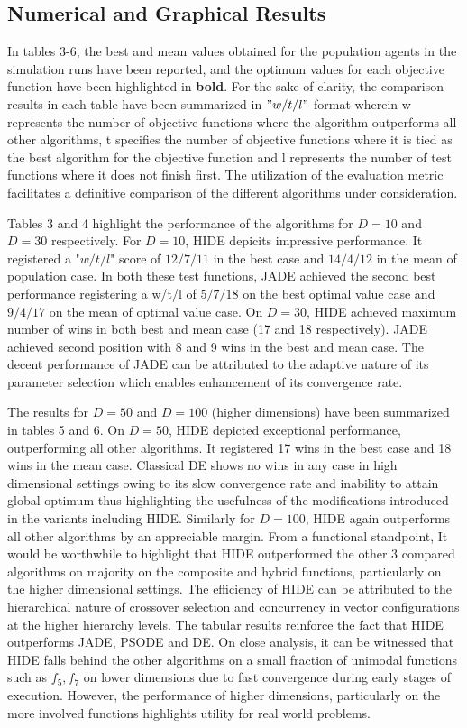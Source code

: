\documentclass[a4paper,twoside]{article}
\begin{document}
\subsection{Numerical and Graphical Results} 
In tables 3-6, the best and mean values obtained for the population agents in the simulation runs have been reported, and the optimum values for each objective function have been highlighted in \textbf{bold}. For the sake of clarity, the comparison results in each table have been summarized in $"w/t/l"$ format wherein w represents the number of objective functions where the algorithm outperforms all other algorithms, t specifies the number of objective functions where it is tied as the best algorithm for the objective function and l represents the number of test functions where it does not finish first. The utilization of the evaluation metric facilitates a definitive comparison of the different algorithms under consideration.
 
Tables 3 and 4 highlight the performance of the algorithms for $D = 10$ and $D = 30$ respectively. For $D = 10$, HIDE depicits impressive performance. It registered a "$w/t/l$" score of $12/7/11$ in the best case and $14/4/12$ in the mean of population case. In both these test functions, JADE achieved the second best performance registering a w/t/l of $5/7/18$ on the best optimal value case and $9/4/17$ on the mean of optimal value case. On $D = 30$, HIDE achieved maximum number of wins in both best and mean case (17 and 18 respectively). JADE achieved second position with 8 and 9 wins in the best and mean case. The decent performance of JADE can be attributed to the adaptive nature of its parameter selection which enables enhancement of its convergence rate.

The results for $D = 50$ and $D = 100$ (higher dimensions) have been summarized in tables 5 and 6. On $D = 50$, HIDE depicted exceptional performance, outperforming all other algorithms. It registered 17 wins in the best case and 18 wins in the mean case. Classical DE shows no wins in any case in high dimensional settings owing to its slow convergence rate and inability to attain global optimum thus highlighting the usefulness of the modifications introduced in the variants including HIDE. Similarly for $D = 100$, HIDE again outperforms all other algorithms by an appreciable margin.
From a functional standpoint, It would be worthwhile to highlight that HIDE outperformed the other 3 compared algorithms on majority on the composite and hybrid functions, particularly on the higher dimensional settings. The efficiency of HIDE can be attributed to the hierarchical nature of crossover selection and concurrency in vector configurations at the higher hierarchy levels.
The tabular results reinforce the fact that HIDE outperforms JADE, PSODE and DE. On close analysis, it can be witnessed that HIDE falls behind the other algorithms on a small fraction of unimodal functions such as $f_5, f_7$ on lower dimensions due to fast convergence during early stages of execution. However, the performance of higher dimensions, particularly on the more involved functions highlights utility for real world problems.
\end{document}
